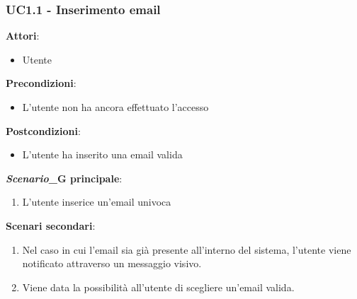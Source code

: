 \subsubsection{UC1.1 - Inserimento email}\label{usecase:1_1}
\textbf{Attori}:
\begin{itemize}
    \item Utente
\end{itemize}
\textbf{Precondizioni}:
\begin{itemize}
    \item L'utente non ha ancora effettuato l'accesso
\end{itemize}
\textbf{Postcondizioni}:
\begin{itemize}
    \item L'utente ha inserito una email valida
\end{itemize}
\textbf{\textit{Scenario}_G principale}:
\begin{enumerate}
    \item L'utente inserice un'email univoca
\end{enumerate}
\textbf{Scenari secondari}:
\begin{enumerate}
    \item Nel caso in cui l'email sia già presente all'interno del sistema, l'utente viene notificato attraverso un messaggio visivo.
    \item Viene data la possibilità all'utente di scegliere un'email valida.
\end{enumerate}